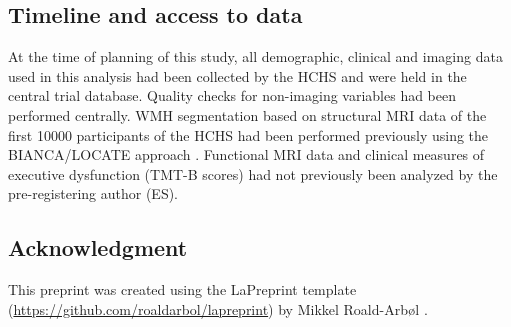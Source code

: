 \subsection{Timeline and access to data}
At the time of planning of this study, all demographic, clinical and imaging data used in this analysis had been collected by the HCHS and were held in the central trial database.
Quality checks for non-imaging variables had been performed centrally.
WMH segmentation based on structural MRI data of the first \num{10000} participants of the HCHS had been performed previously using the BIANCA/LOCATE approach \citep{Rimmele2022-bz}.
Functional MRI data and clinical measures of executive dysfunction (TMT-B scores) had not previously been analyzed by the pre-registering author (ES).

\subsection{Acknowledgment}
This preprint was created using the LaPreprint template (\url{https://github.com/roaldarbol/lapreprint}) by Mikkel Roald-Arb\o l \textsuperscript{}.

